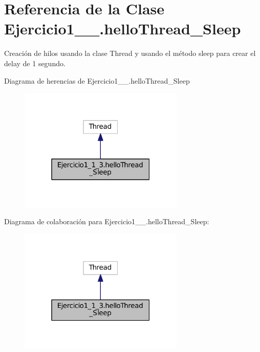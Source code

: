 \hypertarget{class_ejercicio1__1__3_1_1hello_thread___sleep}{}\section{Referencia de la Clase Ejercicio1\+\_\+\_.\+hello\+Thread\+\_\+\+Sleep}
\label{class_ejercicio1__1__3_1_1hello_thread___sleep}


Creación de hilos usando la clase Thread y usando el método sleep para crear el delay de 1 segundo.  




Diagrama de herencias de Ejercicio1\+\_\+\_.\+hello\+Thread\+\_\+\+Sleep
\nopagebreak
\begin{figure}[H]
\begin{center}
\leavevmode
\includegraphics[width=223pt]{class_ejercicio1__1__3_1_1hello_thread___sleep__inherit__graph}
\end{center}
\end{figure}


Diagrama de colaboración para Ejercicio1\+\_\+\_.\+hello\+Thread\+\_\+\+Sleep\+:
\nopagebreak
\begin{figure}[H]
\begin{center}
\leavevmode
\includegraphics[width=223pt]{class_ejercicio1__1__3_1_1hello_thread___sleep__coll__graph}
\end{center}
\end{figure}
